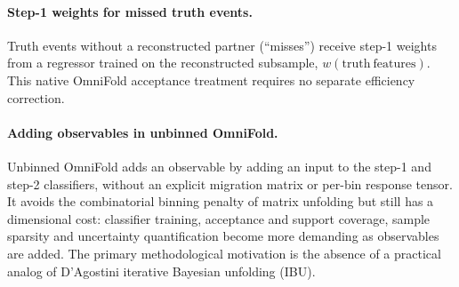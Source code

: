 \paragraph{Step-1 weights for missed truth events.} Truth events without a reconstructed partner (``misses'') receive step-1 weights from a regressor trained on the reconstructed subsample, $w(\mathrm{truth\ features})$. This native OmniFold acceptance treatment requires no separate efficiency correction.

\paragraph{Adding observables in unbinned OmniFold.} Unbinned OmniFold adds an observable by adding an input to the step-1 and step-2 classifiers, without an explicit migration matrix or per-bin response tensor. It avoids the combinatorial binning penalty of matrix unfolding but still has a dimensional cost: classifier training, acceptance and support coverage, sample sparsity and uncertainty quantification become more demanding as observables are added. The primary methodological motivation is the absence of a practical analog of D'Agostini iterative Bayesian unfolding (IBU).

